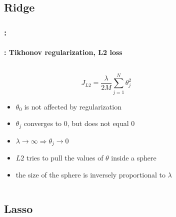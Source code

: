 \documentclass[xcolor=table]{beamer}%
\begin{document}
\subsection{Ridge}

\begin{frame}
	\frametitle{\insertshortsubtitle: \insertsection}
	\framesubtitle{\insertsubsection: Tikhonov regularization, L2 loss}
	
	\begin{columns}
		\begin{column}{.64\textwidth}
			\[J_{L2} = \frac{\lambda}{2M} \sum_{j=1}^{N} \theta_j^2\]
	
			\begin{itemize}
				\item $\theta_0$ is not affected by regularization
				\item $\theta_j$ converges to $0$, but does not equal $0$
				\item $\lambda \rightarrow \infty \Rightarrow \theta_j \rightarrow 0$
				\item $L2$ tries to pull the values of $\theta$ inside a sphere
				\item the size of the sphere is inversely proportional to $\lambda$
			\end{itemize}
		\end{column}
		\begin{column}{.35\textwidth}
		\end{column}
	\end{columns}
	
\end{frame}

\subsection{Lasso}
\end{document}
